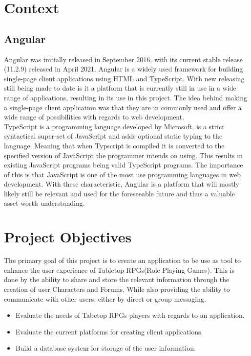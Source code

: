 \section{Context}
\subsection{Angular}
Angular was initially released in September 2016, with its current stable release (11.2.9) released in April 2021.  Angular is a widely used framework for building single-page client applications using HTML and TypeScript.  With new releasing still being made to date is it a platform that is currently still in use in a wide range of applications, resulting in its use in this project.  The idea behind making a single-page client application was that they are in commonly used and offer a wide range of possibilities with regards to web development. \\

TypeScript is a programming language developed by Microsoft, is a strict syntactical super-set of JavaScript and adds optional static typing to the language.  Meaning that when Typscript is compiled it is converted to the specified version of JavaScript the programmer intends on using.  This results in existing JavaScript programs being valid TypeScript programs.  The importance of this is that JavaScript is one of the most use programming languages in web development.  With these characteristic, Angular is a platform that will mostly likely still be relevant and used for the foreseeable future and thus a valuable asset worth understanding.

\section{Project Objectives}
The primary goal of this project is to create an application to be use as tool to enhance the user experience of Tabletop RPGs(Role Playing Games).  This is done by the ability to share and store the relevant information through the creation of user Characters and Forums. While also providing the ability to communicate with other users, either by direct or group messaging.

\begin{itemize}
  \item Evaluate the needs of Tabetop RPGs players with regards to an application.
  \item Evaluate the current platforms for creating client applications.
  \item Build a database system for storage of the user information.
\end{itemize}

